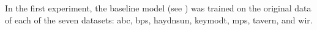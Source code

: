 
In the first experiment, the baseline model (see
) was trained on the original data
of each of the seven datasets: \gls{abc}, \gls{bps},
\gls{haydnsun}, \gls{keymodt}, \gls{mps}, \gls{tavern}, and
\gls{wir}.
